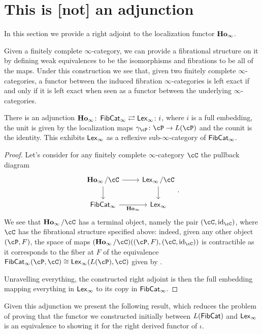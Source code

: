 \documentclass[a4paper,12pt]{scrartcl}
\begin{document}
\section{This is [not] an adjunction}

In this section we provide a right adjoint to the localization functor $\operatorname{\mathbf{Ho}_\infty}$.

\begin{rmk}
  Given a finitely complete $\infty$-category, we can provide a fibrational
  structure on it by defining weak equivalences to be the isomorphisms and
  fibrations to be all of the maps. Under this construction we see that, given
  two finitely complete $\infty$-categories, a functor between the induced
  fibration $\infty$-categories is left exact if and only if it is left exact
  when seen as a functor between the underlying $\infty$-categories.
\end{rmk}

\begin{prop}\label{adj}
  There is an adjunction $\operatorname{\mathbf{Ho}_\infty}\colon\operatorname{\mathsf{FibCat}}_\infty\rightleftarrows\operatorname{\mathsf{Lex}_\infty}\colon
  i$, where $i$ is a full embedding, the unit is given by the
  localization maps $\gamma_{\cP}\colon\cP\rightarrow L(\cP)$ and the counit is
  the identity. This exhibits $\operatorname{\mathsf{Lex}_\infty}$ as a reflexive sub-$\infty$-category of
  $\operatorname{\mathsf{FibCat}}_\infty$.
\end{prop}
\begin{proof}
  Let's consider for any finitely complete $\infty$-category $\cC$ the pullback
  diagram
  \[\begin{tikzcd}
    {\Hoi/\cC} & {\Lexi/\cC} \\
    {\FibCat_\infty} & {\Lexi}
    \arrow["\Hoi"', from=2-1, to=2-2]
    \arrow[from=1-2, to=2-2]
    \arrow[from=1-1, to=2-1]
    \arrow[from=1-1, to=1-2]
  \end{tikzcd}.\]
  We see that $\Hoi/\cC$ has a terminal object, namely the pair $(\cC,\id_\cC)$,
  where $\cC$ has the fibrational structure specified above: indeed, given any
  other object $(\cP,F)$, the space of maps
  $(\Hoi/\cC)((\cP,F),(\cC,\id_\cC))$ is contractible as it corresponds to the
  fiber at $F$ of the equivalence
  $\FibCat_\infty(\cP,\cC)\cong\Lexi(L(\cP),\cC)$ given by \cite[Prop.\
  7.5.11]{Cis19}.

  Unravelling everything, the constructed right adjoint is then the full
  embedding mapping everything in $\operatorname{\mathsf{Lex}_\infty}$ to its copy in $\operatorname{\mathsf{FibCat}}_\infty$.
\end{proof}

Given this adjunction we present the following result, which reduces the
problem of proving that the functor we constructed initially between $L(\operatorname{\mathsf{FibCat}})$
and $\operatorname{\mathsf{Lex}_\infty}$ is an equivalence to showing it for the right derived functor of
$\iota$.
\end{document}
